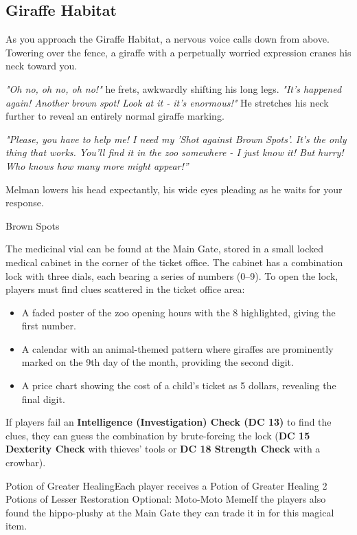 \subsection*{ Giraffe Habitat}
\begin{DndReadAloud}{}
	As you approach the Giraffe Habitat, a nervous voice calls down from above. Towering over the fence, a giraffe with a perpetually worried expression cranes his neck toward you.

	\textit{"Oh no, oh no, oh no!"} he frets, awkwardly shifting his long legs. \textit{"It's happened again! Another brown spot! Look at it - it's enormous!"} He stretches his neck further to reveal an entirely normal giraffe marking.

	\textit{"Please, you have to help me! I need my 'Shot against Brown Spots'. It's the only thing that works. You'll find it in the zoo somewhere - I just know it! But hurry! Who knows how many more might appear!”}

	Melman lowers his head expectantly, his wide eyes pleading as he waits for your response.
\end{DndReadAloud}

\begin{DndQuestHook}[width=0.5\textwidth - 4pt]{Brown Spots}
	\DndQuestHookBasics[
		location = {Giraffe Habitat},
		quest-giver = {Melman, the Giraffe},
		objective = {Find the medicine (\textit{"Shot against Brown Spots"})},
	]
	
	{\noindent\entryfont The medicinal vial can be found at the  Main Gate, stored in a small locked medical cabinet in the corner of the ticket office. The cabinet has a combination lock with three dials, each bearing a series of numbers (0–9). To open the lock, players must find clues scattered in the ticket office area:
	\begin{itemize}
		\item A faded poster of the zoo opening hours with the 8 highlighted, giving the first number.
		\item A calendar with an animal-themed pattern where giraffes are prominently marked on the 9th day of the month, providing the second digit.
		\item A price chart showing the cost of a child's ticket as 5 dollars, revealing the final digit.
	\end{itemize}
	If players fail an \textbf{Intelligence (Investigation) Check (DC 13)} to find the clues, they can guess the combination by brute-forcing the lock (\textbf{DC 15 Dexterity Check} with thieves' tools or \textbf{DC 18 Strength Check} with a crowbar).
	}
	
	{%
		{Potion of Greater Healing}{Each player receives a Potion of Greater Healing}%
		{2 Potions of Lesser Restoration}{}
		{Optional: Moto-Moto Meme}{If the players also found the hippo-plushy at the  Main Gate they can trade it in for this magical item.}
	}%
\end{DndQuestHook}

